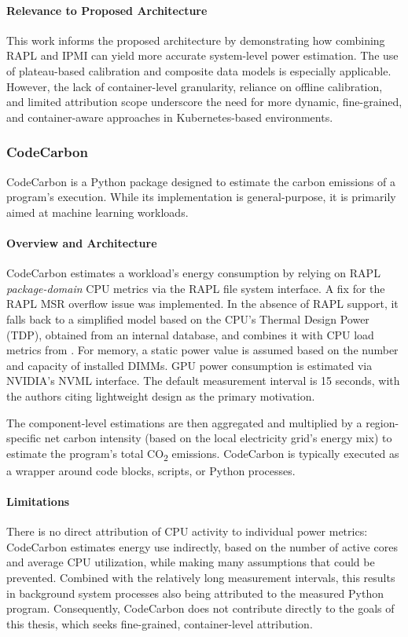 \paragraph{Relevance to Proposed Architecture}
This work informs the proposed architecture by demonstrating how combining RAPL and IPMI can yield more accurate system-level power estimation. The use of plateau-based calibration and composite data models is especially applicable. However, the lack of container-level granularity, reliance on offline calibration, and limited attribution scope underscore the need for more dynamic, fine-grained, and container-aware approaches in Kubernetes-based environments.

\subsubsection{CodeCarbon}
CodeCarbon\parencite{codecarbon_2024} is a Python package designed to estimate the carbon emissions of a program’s execution. While its implementation is general-purpose, it is primarily aimed at machine learning workloads.

\paragraph{Overview and Architecture}
CodeCarbon estimates a workload’s energy consumption by relying on RAPL \textit{package-domain} CPU metrics via the  RAPL file system interface. A fix for the RAPL MSR overflow issue was implemented\parencite{codecarbon_issue_322}. In the absence of RAPL support, it falls back to a simplified model based on the CPU’s Thermal Design Power (TDP), obtained from an internal database, and combines it with CPU load metrics from . For memory, a static power value is assumed based on the number and capacity of installed DIMMs. GPU power consumption is estimated via NVIDIA’s NVML interface. The default measurement interval is 15 seconds, with the authors citing lightweight design as the primary motivation.

The component-level estimations are then aggregated and multiplied by a region-specific net carbon intensity (based on the local electricity grid’s energy mix) to estimate the program’s total CO\textsubscript{2} emissions. CodeCarbon is typically executed as a wrapper around code blocks, scripts, or Python processes.

\paragraph{Limitations}
There is no direct attribution of CPU activity to individual power metrics: CodeCarbon estimates energy use indirectly, based on the number of active cores and average CPU utilization, while making many assumptions that could be prevented. Combined with the relatively long measurement intervals, this results in background system processes also being attributed to the measured Python program. Consequently, CodeCarbon does not contribute directly to the goals of this thesis, which seeks fine-grained, container-level attribution.

